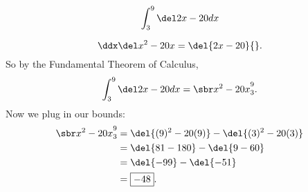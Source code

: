 \renewcommand{\avibounds}{_3^9}
\renewcommand{\avifn}{\del{2x - 20}}
\renewcommand{\avianti}{x^2 - 20x}
\renewcommand{\aviconstant}{}

\begin{probboxed}
    \[
        \aviprob{}
    \]
\end{probboxed}

\aviinversepowerrule
\[
    \ddx\del\avianti{} = \avifn{}.
\]
So by the Fundamental Theorem of Calculus,
\[
    \aviprob{}
    = \avibounded{}.
\]
Now we plug in our bounds:
\begin{align*}
    \avibounded{}
    &= \del{(9)^2 - 20(9)} - \del{(3)^2 - 20(3)} \\
    &= \del{81 - 180} - \del{9 - 60} \\
    &= \del{-99} - \del{-51} \\
    &= \boxed{-48}.
\end{align*}
